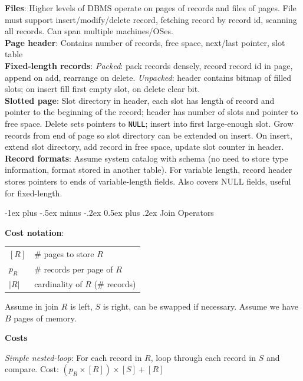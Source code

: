 \documentclass[10pt,landscape]{article}
\makeatletter
\renewcommand{\section}{\@startsection{section}{1}{0mm}%
                                {-1ex plus -.5ex minus -.2ex}%
                                {0.5ex plus .2ex}%
                                {\normalfont\large\bfseries}}
\makeatother
\begin{document}
\begin{multicols}{3}
\textbf{Files}: Higher levels of DBMS operate on pages of records and files of pages. File must support insert/modify/delete record, fetching record by record id, scanning all records. Can span multiple machines/OSes. \\
\textbf{Page header}: Contains number of records, free space, next/last pointer, slot table \\
\textbf{Fixed-length records}: \textit{Packed}: pack records densely, record record id in page, append on add, rearrange on delete. \textit{Unpacked}: header contains bitmap of filled slots; on insert fill first empty slot, on delete clear bit. \\
\textbf{Slotted page}: Slot directory in header, each slot has length of record and pointer to the beginning of the record; header has number of slots and pointer to free space. Delete sets pointers to \texttt{NULL}; insert into first large-enough slot. Grow records from end of page so slot directory can be extended on insert. On insert, extend slot directory, add record in free space, update slot counter in header. \\
\textbf{Record formats}: Assume system catalog with schema (no need to store type information, format stored in another table). For variable length, record header stores pointers to ends of variable-length fields. Also covers NULL fields, useful for fixed-length.


\section{Join Operators}

\textbf{Cost notation}:

\begin{tabular}{@{}ll@{}}
$[R]$   & \# pages to store $R$ \\
$p_R$   & \# records per page of $R$ \\
$|R|$   & cardinality of $R$ (\# records)
\end{tabular}

Assume in join $R$ is left, $S$ is right, can be swapped if necessary. Assume we have $B$ pages of memory.

\textbf{Costs}

\textit{Simple nested-loop}: For each record in $R$, loop through each record in $S$ and compare. Cost: $(p_R \times [R]) \times [S] + [R]$


\end{multicols}
\end{document}
